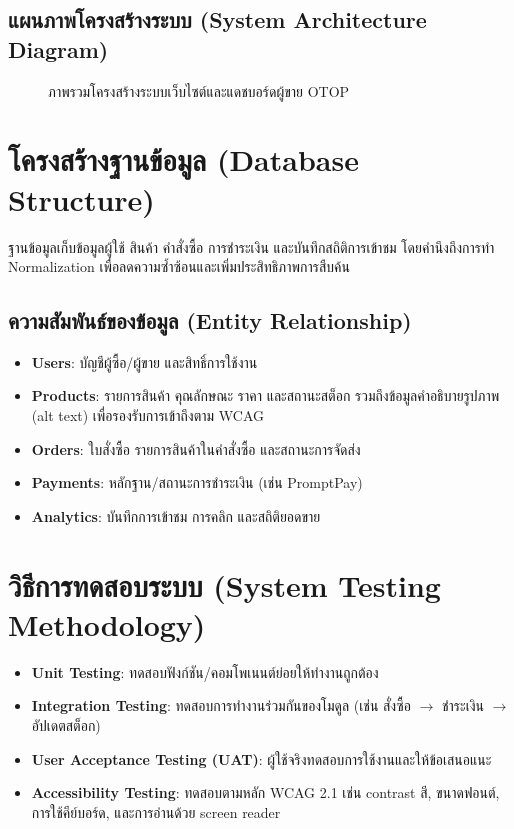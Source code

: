 \subsection{แผนภาพโครงสร้างระบบ (System Architecture Diagram)}
\begin{figure}[h]
  \centering
  \caption[System architecture]{ภาพรวมโครงสร้างระบบเว็บไซต์และแดชบอร์ดผู้ขาย OTOP}
  \label{fig:system-architecture}
\end{figure}

\section{โครงสร้างฐานข้อมูล (Database Structure)}
ฐานข้อมูลเก็บข้อมูลผู้ใช้ สินค้า คำสั่งซื้อ การชำระเงิน และบันทึกสถิติการเข้าชม \cite{pressman2014}
โดยคำนึงถึงการทำ Normalization เพื่อลดความซ้ำซ้อนและเพิ่มประสิทธิภาพการสืบค้น

\subsection{ความสัมพันธ์ของข้อมูล (Entity Relationship)}
\begin{itemize}
  \item \textbf{Users}: บัญชีผู้ซื้อ/ผู้ขาย และสิทธิ์การใช้งาน \cite{pressman2014}
  \item \textbf{Products}: รายการสินค้า คุณลักษณะ ราคา และสถานะสต็อก 
  รวมถึงข้อมูลคำอธิบายรูปภาพ (alt text) เพื่อรองรับการเข้าถึงตาม WCAG \cite{ecommerce2019}
  \item \textbf{Orders}: ใบสั่งซื้อ รายการสินค้าในคำสั่งซื้อ และสถานะการจัดส่ง \cite{ecommerce2019}
  \item \textbf{Payments}: หลักฐาน/สถานะการชำระเงิน (เช่น PromptPay) \cite{promptpay2021}
  \item \textbf{Analytics}: บันทึกการเข้าชม การคลิก และสถิติยอดขาย \cite{otop2020}
\end{itemize}

\section{วิธีการทดสอบระบบ (System Testing Methodology)}
\begin{itemize}
  \item \textbf{Unit Testing}: ทดสอบฟังก์ชัน/คอมโพเนนต์ย่อยให้ทำงานถูกต้อง \cite{pressman2014}
  \item \textbf{Integration Testing}: ทดสอบการทำงานร่วมกันของโมดูล 
  (เช่น สั่งซื้อ \(\rightarrow\) ชำระเงิน \(\rightarrow\) อัปเดตสต็อก) \cite{pressman2014}
  \item \textbf{User Acceptance Testing (UAT)}: ผู้ใช้จริงทดสอบการใช้งานและให้ข้อเสนอแนะ \cite{ecommerce2019}
  \item \textbf{Accessibility Testing}: ทดสอบตามหลัก WCAG 2.1 เช่น contrast สี, 
  ขนาดฟอนต์, การใช้คีย์บอร์ด, และการอ่านด้วย screen reader
\end{itemize}

